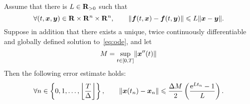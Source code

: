 \begin{theorem}
    \label{theorem:forward_euler}
    Assume that there is $L \in \mathbf R_{>0}$ such that
    \begin{equation}
        \label{eq:global_lipschitz}
        \forall (t, \vect x, \vect y) \in \real \times \real^n \times \real^n, \qquad
        \vecnorm{\vect f(t, \vect x) - \vect f(t, \vect y)}
        \leq L \vecnorm{\vect x - \vect y}.
    \end{equation}
    Suppose in addition that there exists a unique, twice continuously differentiable and globally defined solution to~\eqref{eq:ode},
    and let
    \[
        M = \sup_{t \in [0,T]} \lVert\mathbf{\boldsymbol{x}}''(t)\rVert
    \]
    Then the following error estimate holds:
    \begin{equation}
        \label{eq:error_bound_forward_euler}
        \forall n \in \left\{0, 1, \dotsc, \floor*{\frac{T}{\Delta}} \right\},
        \qquad
        \vecnorm{\vect x(t_n) - \vect x_n}
        \leq
        \frac{\Delta M}{2} \left( \frac{\e^{L t_n} - 1}{L} \right).
    \end{equation}
\end{theorem}
